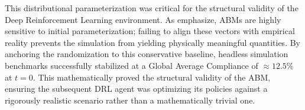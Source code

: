 This distributional parameterization was critical for the structural validity of the Deep Reinforcement Learning environment. As \cite{Ding2024} emphasize, ABMs are highly sensitive to initial parameterization; failing to align these vectors with empirical reality prevents the simulation from yielding physically meaningful quantities. By anchoring the randomization to this conservative baseline, headless simulation benchmarks successfully stabilized at a Global Average Compliance of $\approx 12.5\%$ at $t = 0$. This mathematically proved the structural validity of the ABM, ensuring the subsequent DRL agent was optimizing its policies against a rigorously realistic scenario rather than a mathematically trivial one.